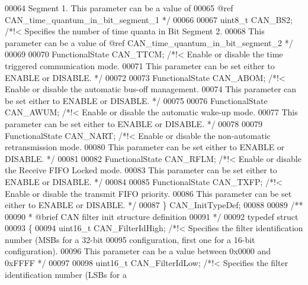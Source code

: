 \begin{DoxyCode}
00064 \textcolor{comment}{                                 Segment 1. This parameter can be a value of }
00065 \textcolor{comment}{                                 @ref CAN\_time\_quantum\_in\_bit\_segment\_1 */}
00066 
00067   uint8\_t CAN_BS2;          \textcolor{comment}{/*!< Specifies the number of time quanta in Bit Segment 2.}
00068 \textcolor{comment}{                                 This parameter can be a value of @ref
       CAN\_time\_quantum\_in\_bit\_segment\_2 */}
00069 
00070   FunctionalState CAN_TTCM; \textcolor{comment}{/*!< Enable or disable the time triggered communication mode.}
00071 \textcolor{comment}{                                This parameter can be set either to ENABLE or DISABLE. */}
00072 
00073   FunctionalState CAN_ABOM;  \textcolor{comment}{/*!< Enable or disable the automatic bus-off management.}
00074 \textcolor{comment}{                                  This parameter can be set either to ENABLE or DISABLE. */}
00075 
00076   FunctionalState CAN_AWUM;  \textcolor{comment}{/*!< Enable or disable the automatic wake-up mode. }
00077 \textcolor{comment}{                                  This parameter can be set either to ENABLE or DISABLE. */}
00078 
00079   FunctionalState CAN_NART;  \textcolor{comment}{/*!< Enable or disable the non-automatic retransmission mode.}
00080 \textcolor{comment}{                                  This parameter can be set either to ENABLE or DISABLE. */}
00081 
00082   FunctionalState CAN_RFLM;  \textcolor{comment}{/*!< Enable or disable the Receive FIFO Locked mode.}
00083 \textcolor{comment}{                                  This parameter can be set either to ENABLE or DISABLE. */}
00084 
00085   FunctionalState CAN_TXFP;  \textcolor{comment}{/*!< Enable or disable the transmit FIFO priority.}
00086 \textcolor{comment}{                                  This parameter can be set either to ENABLE or DISABLE. */}
00087 \} CAN\_InitTypeDef;
00088 
00089 \textcolor{comment}{/** }
00090 \textcolor{comment}{  * @brief  CAN filter init structure definition}
00091 \textcolor{comment}{  */}
00092 \textcolor{keyword}{typedef} \textcolor{keyword}{struct}
00093 \{
00094   uint16\_t CAN_FilterIdHigh;         \textcolor{comment}{/*!< Specifies the filter identification number (MSBs for a
       32-bit}
00095 \textcolor{comment}{                                              configuration, first one for a 16-bit configuration).}
00096 \textcolor{comment}{                                              This parameter can be a value between 0x0000 and 0xFFFF
       */}
00097 
00098   uint16\_t CAN_FilterIdLow;          \textcolor{comment}{/*!< Specifies the filter identification number (LSBs for a
}
\end{DoxyCode}
